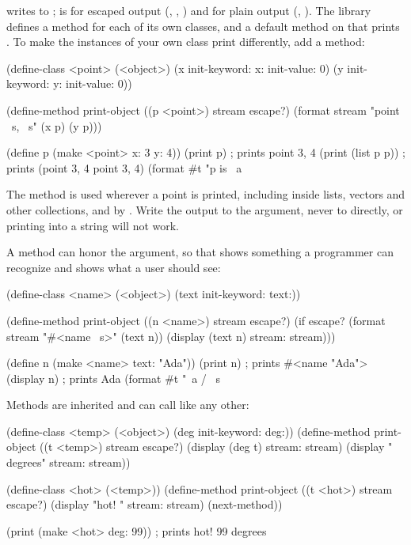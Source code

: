 \noindent
{} writes  to ; 
is  for escaped output (, , )
and  for plain output (, ). The library
defines a method for each of its own classes, and a default method on
 that prints . To make
the instances of your own class print differently, add a method:

\begin{dylan}
(define-class <point> (<object>)
  (x init-keyword: x: init-value: 0)
  (y init-keyword: y: init-value: 0))

(define-method print-object ((p <point>) stream escape?)
  (format stream "{point ~s, ~s}" (x p) (y p)))

(define p (make <point> x: 3 y: 4))
(print p)                     ; prints {point 3, 4}
(print (list p p))            ; prints ({point 3, 4} {point 3, 4})
(format #t "p is ~a~%
\end{dylan}

\noindent
The method is used wherever a point is printed, including inside lists,
vectors and other collections, and by . Write the output
to the  argument, never to 
directly, or printing into a string will not work.

A method can honor the  argument, so that 
shows something a programmer can recognize and  shows what
a user should see:

\begin{dylan}
(define-class <name> (<object>) (text init-keyword: text:))

(define-method print-object ((n <name>) stream escape?)
  (if escape?
      (format stream "#<name ~s>" (text n))
      (display (text n) stream: stream)))

(define n (make <name> text: "Ada"))
(print n)                       ; prints #<name "Ada">
(display n)                     ; prints Ada
(format #t "~a / ~s~%
\end{dylan}

\noindent
Methods are inherited and can call  like any other:

\begin{dylan}
(define-class <temp> (<object>) (deg init-keyword: deg:))
(define-method print-object ((t <temp>) stream escape?)
  (display (deg t) stream: stream)
  (display " degrees" stream: stream))

(define-class <hot> (<temp>))
(define-method print-object ((t <hot>) stream escape?)
  (display "hot! " stream: stream)
  (next-method))

(print (make <hot> deg: 99))    ; prints hot! 99 degrees
\end{dylan}

